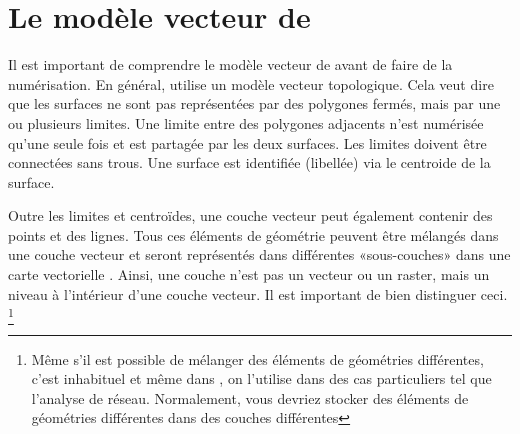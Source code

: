 \section{Le modèle vecteur de \grass}\label{label_vectmodel}

Il est important de comprendre le modèle vecteur de \grass avant de faire de la numérisation. En général, \grass utilise un modèle vecteur topologique. Cela veut dire que les surfaces ne sont pas représentées par des polygones fermés, mais par une ou plusieurs limites. Une limite entre des polygones adjacents n'est numérisée qu'une seule fois et est partagée par les deux surfaces. Les limites doivent être connectées sans trous. Une surface est identifiée (libellée) via le centroide de la surface.


Outre les limites et centroïdes, une couche vecteur peut également contenir des points et des lignes. Tous ces éléments de géométrie peuvent être mélangés dans une couche vecteur et seront représentés dans différentes «sous-couches» dans une carte vectorielle \grass. Ainsi, une couche \grass n'est pas un vecteur ou un raster, mais un niveau à l'intérieur d'une couche vecteur. Il est important de bien distinguer ceci.
\footnote{Même s'il est possible de mélanger des éléments de géométries différentes, c'est inhabituel et même dans \grass, on l'utilise dans des cas particuliers tel que l'analyse de réseau. Normalement, vous devriez stocker des éléments de géométries différentes dans des couches différentes}

